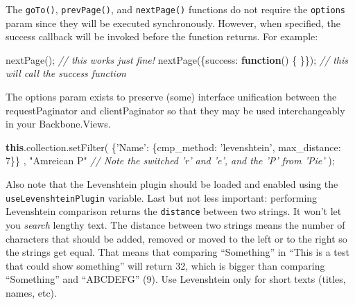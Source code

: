 \documentclass[9pt]{book}
\newenvironment{Shaded}{}{}
\newcommand{\KeywordTok}[1]{\textcolor[rgb]{0.00,0.44,0.13}{\textbf{{#1}}}}
\newcommand{\DataTypeTok}[1]{\textcolor[rgb]{0.56,0.13,0.00}{{#1}}}
\newcommand{\DecValTok}[1]{\textcolor[rgb]{0.25,0.63,0.44}{{#1}}}
\newcommand{\StringTok}[1]{\textcolor[rgb]{0.25,0.44,0.63}{{#1}}}
\newcommand{\CommentTok}[1]{\textcolor[rgb]{0.38,0.63,0.69}{\textit{{#1}}}}
\newcommand{\OtherTok}[1]{\textcolor[rgb]{0.00,0.44,0.13}{{#1}}}
\newcommand{\FunctionTok}[1]{\textcolor[rgb]{0.02,0.16,0.49}{{#1}}}
\newcommand{\NormalTok}[1]{{#1}}
\begin{document}
The \texttt{goTo()}, \texttt{prevPage()}, and \texttt{nextPage()}
functions do not require the \texttt{options} param since they will be
executed synchronously. However, when specified, the success callback
will be invoked before the function returns. For example:

\begin{Shaded}
\begin{Highlighting}[]
\FunctionTok{nextPage}\NormalTok{(); }\CommentTok{// this works just fine!}
\FunctionTok{nextPage}\NormalTok{(\{}\DataTypeTok{success}\NormalTok{: }\KeywordTok{function}\NormalTok{() \{ \}\}); }\CommentTok{// this will call the success function}
\end{Highlighting}
\end{Shaded}

The options param exists to preserve (some) interface unification
between the requestPaginator and clientPaginator so that they may be
used interchangeably in your Backbone.Views.

\begin{Shaded}
\begin{Highlighting}[]
  \KeywordTok{this}\NormalTok{.}\OtherTok{collection}\NormalTok{.}\FunctionTok{setFilter}\NormalTok{(}
    \NormalTok{\{}\StringTok{'Name'}\NormalTok{: \{}\DataTypeTok{cmp_method}\NormalTok{: }\StringTok{'levenshtein'}\NormalTok{, }\DataTypeTok{max_distance}\NormalTok{: }\DecValTok{7}\NormalTok{\}\}}
    \NormalTok{, }\StringTok{"Amreican P"} \CommentTok{// Note the switched 'r' and 'e', and the 'P' from 'Pie'}
  \NormalTok{);}
\end{Highlighting}
\end{Shaded}

Also note that the Levenshtein plugin should be loaded and enabled using
the \texttt{useLevenshteinPlugin} variable. Last but not less important:
performing Levenshtein comparison returns the \texttt{distance} between
two strings. It won't let you \emph{search} lengthy text. The distance
between two strings means the number of characters that should be added,
removed or moved to the left or to the right so the strings get equal.
That means that comparing ``Something'' in ``This is a test that could
show something'' will return 32, which is bigger than comparing
``Something'' and ``ABCDEFG'' (9). Use Levenshtein only for short texts
(titles, names, etc).
\end{document}
